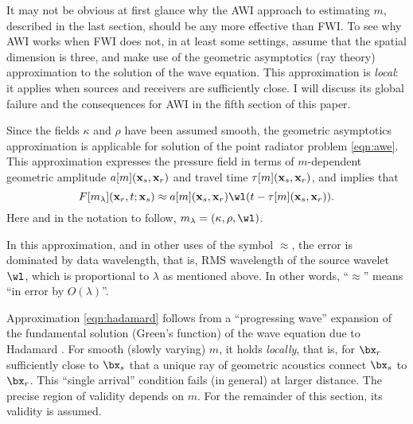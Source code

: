 It may not be obvious at first glance why the AWI approach to estimating
$m$, described in the last section, should be any more effective than
FWI. To see why AWI works when FWI does not, in at
least some settings, assume that the spatial dimension is three,
and make use of the geometric asymptotics (ray theory) approximation
to the solution of the wave equation. This approximation is {\em
  local}: it applies when sources and receivers are sufficiently
close. I will discuss its global failure and the consequences for AWI
in the fifth section of this paper.



Since the fields $\kappa$ and $\rho$ have been assumed smooth,
the geometric asymptotics approximation is applicable for solution of the point
radiator problem \ref{eqn:awe}. This approximation expresses the pressure field in terms
of $m$-dependent geometric amplitude $a[m]({\bf x}_s,{\bf x}_r)$ and
travel time $\tau[m]({\bf x}_s,{\bf x}_r)$, and implies that
\begin{equation}
  \label{eqn:hadamard}
  F[m_{\lambda}]({\bf x}_r,t;{\bf x}_s) \approx a[m]({\bf x}_s,{\bf x}_r) \wl(t-\tau[m]({\bf x}_s,{\bf x}_r)). 
\end{equation}
Here and in the notation to follow, $m_{\lambda} =
(\kappa,\rho,\wl)$.

In this approximation, and in other uses of the symbol $\approx$, the
error is dominated by data wavelength, that is, RMS wavelength of the
source wavelet $\wl$, which is proportional to $\lambda$ as mentioned above. In other words, ``$\approx$'' means ``in error by $O(\lambda)$''.

Approximation \ref{eqn:hadamard} follows from a
``progressing wave''  expansion of the fundamental
solution (Green's function) of the wave equation due to Hadamard
\cite[]{Friedlander:75,Qian:JCP24}. For smooth (slowly varying)
$m$, it holds {\em locally}, that is, for $\bx_r$ sufficiently close to $\bx_s$ that a unique ray of
geometric acoustics connect $\bx_s$ to $\bx_r$. This ``single
arrival'' condition fails (in
general) at larger distance. The precise region of validity depends on
$m$. For the remainder of this section, its validity is assumed.

